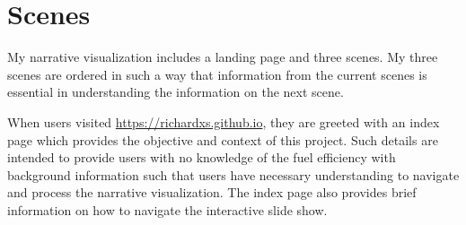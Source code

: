 \documentclass[11pt]{article}
\begin{document}
\section{Scenes}
My narrative visualization includes a landing page and three scenes. My three scenes are ordered in such a way that information from the current scenes is essential in understanding the information on the next scene. 

When users visited \url{https://richardxs.github.io}, they are greeted with an index page which provides the objective and context of this project. Such details are intended to provide users with no knowledge of the fuel efficiency with background information such that users have necessary understanding to navigate and process the narrative visualization. The index page also provides brief information on how to navigate the interactive slide show.
\end{document}
